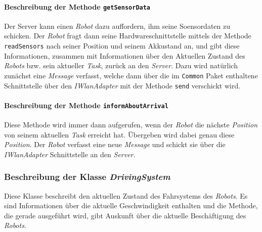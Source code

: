 			\paragraph{Beschreibung der Methode \texttt{getSensorData}}
			Der Server kann einen \textit{Robot} dazu auffordern, ihm seine Soensordaten zu schicken. Der \textit{Robot} fragt dann seine Hardwareschnittstelle mittels der Methode \texttt{readSensors} 
			nach seiner Position und seinem Akkustand an, und gibt diese Informationen, zusammen mit Informationen über den Aktuellen Zustand des \textit{Robots} bzw. sein aktueller \textit{Task}, zurück an den \textit{Server}. Dazu wird natürlich zunächst eine \textit{Message} verfasst, welche dann über die im \texttt{Common} Paket enthaltene Schnittstelle über den \textit{IWlanAdapter} mit der Methode \texttt{send} verschickt wird.
			
			\paragraph{Beschreibung der Methode \texttt{informAboutArrival}}
			Diese Methode wird immer dann aufgerufen, wenn der \textit{Robot} die nächste \textit{Position} von seinem aktuellen \textit{Task} erreicht hat. Übergeben wird dabei genau diese \textit{Position}. Der \textit{Robot} verfasst eine neue \textit{Message} und schickt sie über die \textit{IWlanAdapter} Schnittstelle an den \textit{Server}. 
			
	\subsubsection{Beschreibung der Klasse \textit{DrivingSystem}}
		
		Diese Klasse beschreibt den aktuellen Zustand des Fahrsystems des \textit{Robots}. 
		Es sind Informationen über die aktuelle Geschwindigkeit enthalten und die Methode, 
		die gerade ausgeführt wird, gibt Auskunft über die aktuelle Beschäftigung des \textit{Robots}.

